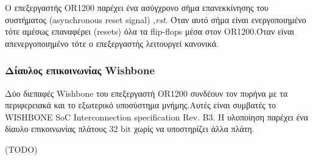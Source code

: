 \documentclass[a4paper,10pt]{article}
\numberwithin{figure}{subsection}
\numberwithin{table}{subsection}
\begin{document}
{O επεξεργαστής OR1200 παρέχει ένα ασύγχρονο σήμα επανεκκίνησης του συστήματος (asynchronous reset signal)
,\emph{rst}. Όταν αυτό σήμα είναι ενεργοποιημένο τότε αμέσως επαναφέρει (resets) όλα τα 
flip-flops μέσα στον OR1200.Όταν είναι απενεργοποιημένο τότε ο επεξεργαστής λειτουργεί κανονικά.

\subsubsection{Δίαυλος επικοινωνίας Wishbone}

Δύο διεπαφές Wishbone του επεξεργαστή OR1200 συνδέουν τον πυρήνα με τα περιφερειακά και το
εξωτερικό υποσύστημα μνήμης.Αυτές είναι συμβατές το WISHBONE SoC Interconnection specification Rev. B3.
Η υλοποίηση παρέχει ένα δίαυλο επικοινωνίας πλάτους 32 bit χωρίς να υποστηρίζει άλλα πλάτη.

(TODO)

\newpage
}
\end{document}
